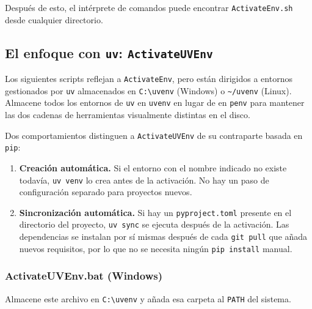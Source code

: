 Después de esto, el intérprete de comandos puede encontrar
\texttt{ActivateEnv.sh} desde cualquier directorio.

\subsection{El enfoque con \texttt{uv}: \texttt{ActivateUVEnv}}
\label{subsec:activateuvenv}

Los siguientes scripts reflejan a \texttt{ActivateEnv}, pero están dirigidos
a entornos gestionados por \texttt{uv} almacenados en
\texttt{C:\textbackslash uvenv} (Windows) o
\texttt{\textasciitilde/uvenv} (Linux). Almacene todos los entornos de
\texttt{uv} en \texttt{uvenv} en lugar de en \texttt{penv} para mantener
las dos cadenas de herramientas visualmente distintas en el disco.

Dos comportamientos distinguen a \texttt{ActivateUVEnv} de su contraparte
basada en \texttt{pip}:

\begin{enumerate}
  \item \textbf{Creación automática.} Si el entorno con el nombre indicado
        no existe todavía, \texttt{uv venv} lo crea antes de la activación.
        No hay un paso de configuración separado para proyectos nuevos.
  \item \textbf{Sincronización automática.} Si hay un \texttt{pyproject.toml}
        presente en el directorio del proyecto, \texttt{uv sync} se ejecuta
        después de la activación. Las dependencias se instalan por sí
        mismas después de cada \texttt{git pull} que añada nuevos
        requisitos, por lo que no se necesita ningún \texttt{pip install}
        manual.
\end{enumerate}

\subsubsection{ActivateUVEnv.bat (Windows)}

Almacene este archivo en \texttt{C:\textbackslash uvenv} y añada esa
carpeta al \texttt{PATH} del sistema.


